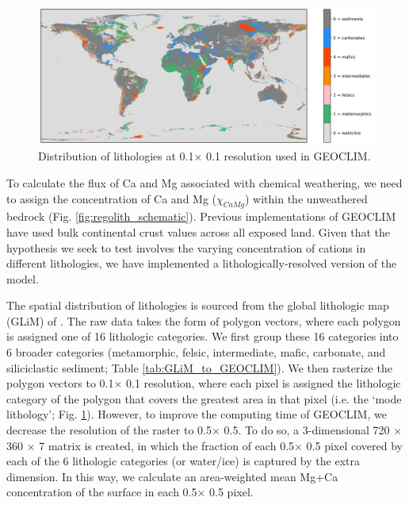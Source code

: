 \documentclass[11pt,letterpaper]{article}
\newcommand{\degrees}{\textdegree\xspace}
\begin{document}
\begin{figure}[h!]
    \centering
    \includegraphics[width=1\textwidth]{Manuscript/Figures/world_lithology.jpg}
    \caption{Distribution of lithologies at 0.1\degrees $\times$ 0.1\degrees resolution used in GEOCLIM.}
    \label{fig:world_lithology}
\end{figure}

To calculate the flux of Ca and Mg associated with chemical weathering, we need to assign the concentration of Ca and Mg ($\chi_{CaMg}$) within the unweathered bedrock (Fig. \ref{fig:regolith_schematic}). Previous implementations of GEOCLIM have used bulk continental crust values across all exposed land. Given that the hypothesis we seek to test involves the varying concentration of cations in different lithologies, we have implemented a lithologically-resolved version of the model.

The spatial distribution of lithologies is sourced from the global lithologic map (GLiM) of \citet{Hartmann2012a}. The raw data takes the form of polygon vectors, where each polygon is assigned one of 16 lithologic categories. We first group these 16 categories into 6 broader categories (metamorphic, felsic, intermediate, mafic, carbonate, and siliciclastic sediment; Table \ref{tab:GLiM_to_GEOCLIM}). We then rasterize the polygon vectors to 0.1\degrees $\times$ 0.1\degrees resolution, where each pixel is assigned the lithologic category of the polygon that covers the greatest area in that pixel (i.e. the `mode lithology'; Fig. \ref{fig:world_lithology}). However, to improve the computing time of GEOCLIM, we decrease the resolution of the raster to 0.5\degrees $\times$ 0.5\degrees. To do so, a 3-dimensional 720 $\times$ 360 $\times$ 7 matrix is created, in which the fraction of each 0.5\degrees $\times$ 0.5\degrees pixel covered by each of the 6 lithologic categories (or water/ice) is captured by the extra dimension. In this way, we calculate an area-weighted mean Mg+Ca concentration of the surface in each 0.5\degrees $\times$ 0.5\degrees pixel.
\end{document}
